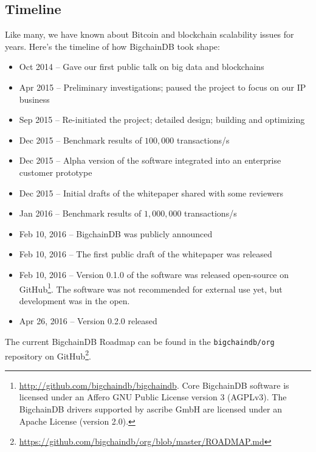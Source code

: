 \subsection{Timeline}
Like many, we have known about Bitcoin and blockchain scalability issues for years.
Here’s the timeline of how BigchainDB took shape:
\begin{itemize}
  \item Oct 2014 – Gave our first public talk on big data and blockchains \cite{mcconaghy2014blockchain}
  \item Apr 2015 – Preliminary investigations; paused the project to focus on our IP business
  \item Sep 2015 – Re-initiated the project; detailed design; building and optimizing
  \item Dec 2015 – Benchmark results of $100,000$ transactions/s
  \item Dec 2015 – Alpha version of the software integrated into an enterprise customer prototype
  \item Dec 2015 – Initial drafts of the whitepaper shared with some reviewers
  \item Jan 2016 – Benchmark results of $1,000,000$ transactions/s
  \item Feb 10, 2016 – BigchainDB was publicly announced
  \item Feb 10, 2016 – The first public draft of the whitepaper was released
  \item Feb 10, 2016 – Version 0.1.0 of the software was released open-source on GitHub\footnote{\url{http://github.com/bigchaindb/bigchaindb}. Core BigchainDB software is licensed under an Affero GNU Public License version 3 (AGPLv3). The BigchainDB drivers supported by ascribe GmbH are licensed under an Apache License (version 2.0).}. The software was not recommended for external use yet, but development was in the open.
  \item Apr 26, 2016 – Version 0.2.0 released
\end{itemize}

The current BigchainDB Roadmap can be found in the \texttt{bigchaindb/org} repository on GitHub\footnote{\url{https://github.com/bigchaindb/org/blob/master/ROADMAP.md}}.